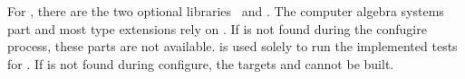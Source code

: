 %                                                                        
%                                                                        
%                                                                        
%                                                                        
%
For \projectname, there are the two optional libraries \LibAlgebra~and \LibAldorUnit. The computer algebra systems part and most type extensions rely on \LibAlgebra. If \LibAlgebra is not found during the confugire process, these parts are not available. \LibAldorUnit is used solely to run the implemented tests for \projectname. If \LibAldorUnit is not found during configure, the targets  and  cannot be built.
